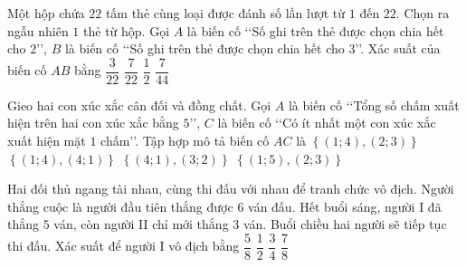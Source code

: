 \begin{ex}%
Một hộp chứa $22$ tấm thẻ cùng loại được đánh số lần lượt từ $1$ đến $22$. Chọn ra ngẫu nhiên $1$ thẻ từ hộp. Gọi $A$ là biến cố \lq\lq Số ghi trên thẻ được chọn chia hết cho $2$\rq\rq, $B$ là biến cố \lq\lq Số ghi trên thẻ được chọn chia hết cho $3$\rq\rq. Xác suất của biến cố $AB$ bằng
	\choice
		{\True $\dfrac{3}{22}$}
		{$\dfrac{7}{22}$}
		{$\dfrac{1}{2}$}
		{$\dfrac{7}{44}$}
\end{ex}
\begin{ex}%
Gieo hai con xúc xắc cân đối và đồng chất. Gọi $A$ là biến cố \lq\lq Tổng số chấm xuất hiện trên hai con xúc xắc bằng $5$\rq\rq, $C$ là biến cố \lq\lq Có ít nhất một con xúc xắc xuất hiện mặt $1$ chấm\rq\rq. Tập hợp mô tả biến cố $AC$ là
	\choice
		{$\left\{(1; 4), (2; 3)\right\}$}
		{\True $\left\{(1; 4), (4; 1)\right\}$}
		{$\left\{(4; 1), (3; 2)\right\}$}
		{$\left\{(1; 5), (2; 3)\right\}$}
\end{ex}
\begin{ex}%
Hai đối thủ ngang tài nhau, cùng thi đấu với nhau để tranh chức vô địch. Người thắng cuộc là người đầu tiên thắng được $6$ ván đấu. Hết buổi sáng, người I đã thắng $5$ ván, còn người II chỉ mới thắng $3$ ván. Buổi chiều hai người sẽ tiếp tục thi đấu. Xác suất để người I vô địch bằng
	\choice
		{$\dfrac{5}{8}$}
		{$\dfrac{1}{2}$}
		{$\dfrac{3}{4}$}
		{\True $\dfrac{7}{8}$}
\end{ex}

